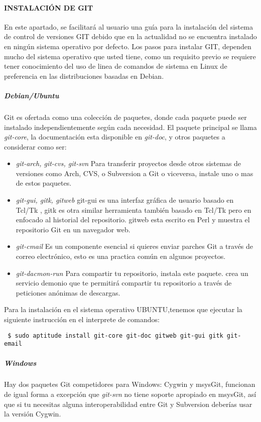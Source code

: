 \paragraph{INSTALACIÓN DE GIT}

En este apartado, se facilitará al usuario una guía para la instalación del sistema de control de versiones GIT debido que en la actualidad no se encuentra instalado en ningún sistema operativo por defecto. Los pasos para instalar GIT, dependen mucho del sistema operativo que usted tiene, como un requisito previo se requiere tener conocimiento del uso de linea de comandos de sistema en Linux de preferencia en las distribuciones basadas en Debian.
\subparagraph{Debian/Ubuntu}
Git es ofertada como una colección de paquetes, donde cada paquete puede ser instalado independientemente según cada necesidad. El paquete principal se llama \textit{git-core}, la documentación esta disponible en \textit{git-doc}, y otros paquetes a considerar como ser:

\begin{itemize}
 \item \textit{git-arch, git-cvs, git-svn}
Para transferir proyectos desde otros sistemas de versiones como Arch, CVS, o Subversion a Git o viceversa,
instale uno o mas de estos paquetes.

\item \textit{git-gui, gitk, gitweb}
git-gui es una interfaz gráfica de usuario basado en Tcl/Tk , gitk es otra similar herramienta también basado en Tcl/Tk pero en enfocado al historial del repositorio.
gitweb esta escrito en Perl y muestra el repositorio Git en un navegador web.

\item \textit{git-cmail}
Es un componente esencial si quieres enviar parches Git a través de correo electrónico, esto es una practica común en algunos proyectos.

\item \textit{git-dacmon-run}
Para compartir tu repositorio, instala este paquete. crea un servicio demonio que te permitirá compartir tu repositorio a través de peticiones anónimas de descargas.
\end{itemize}
Para la instalación en el sistema operativo UBUNTU,tenemos que ejecutar la siguiente instrucción en el interprete de comandos:
\begin{verbatim}
 $ sudo aptitude install git-core git-doc gitweb git-gui gitk git-email
\end{verbatim}

\subparagraph{Windows}
Hay dos paquetes Git competidores para Windows: Cygwin y msysGit, funcionan de igual forma a excepción que \textit{git-svn} no tiene soporte apropiado en msysGit,
así que si tu necesitas alguna interoperabilidad entre Git y Subversion deberías usar la versión Cygwin.

